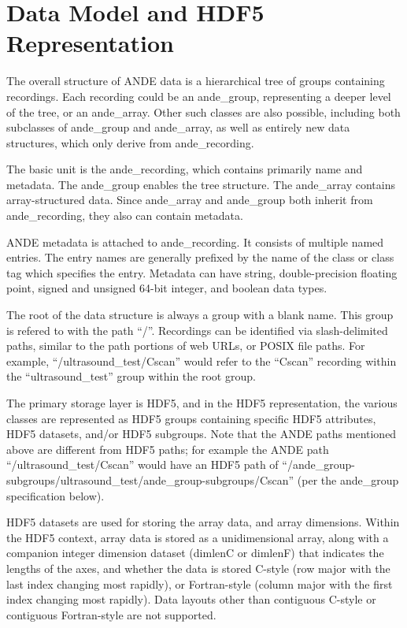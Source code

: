 \documentclass{article}
\begin{document}
\section{Data Model and HDF5 Representation}

The overall structure of ANDE data is a hierarchical tree of groups containing
recordings. Each recording could be an ande\_group, representing a deeper level of the tree, or an ande\_array. Other such classes are also possible, including both subclasses of ande\_group and ande\_array, as well as entirely new data structures, which only derive from ande\_recording.

The basic unit is the ande\_recording, which contains primarily name and metadata. The ande\_group enables the tree structure. The ande\_array contains array-structured data. Since ande\_array and ande\_group both inherit from ande\_recording, they also can contain metadata.

ANDE metadata is attached to ande\_recording. It consists of multiple named entries. The entry names are generally prefixed by the name of the class or class tag which specifies the entry. Metadata can have string, double-precision floating point, signed and unsigned 64-bit integer, and boolean data types.

The root of the data structure is always a group with a blank name. This group is refered to with the path ``/''. Recordings can be identified via slash-delimited paths, similar to the path portions of web URLs, or POSIX file paths. For example, ``/ultrasound\_test/Cscan'' would refer to the ``Cscan'' recording within the ``ultrasound\_test'' group within the root group.

The primary storage layer is HDF5, and in the HDF5 representation, the various classes are represented as HDF5 groups containing specific HDF5 attributes, HDF5 datasets, and/or HDF5 subgroups. Note that the ANDE paths mentioned above are different from HDF5 paths; for example the ANDE path ``/ultrasound\_test/Cscan'' would have an HDF5 path of ``/ande\_group-subgroups/ultrasound\_test/ande\_group-subgroups/Cscan'' (per the ande\_group specification below).

HDF5 datasets are used for storing the array data, and array dimensions. Within the HDF5 context, array data is stored as a unidimensional array, along with a companion integer dimension dataset (dimlenC or dimlenF) that indicates the lengths of the axes, and whether the data is stored C-style (row major with the last index changing most rapidly), or Fortran-style (column major with the first index changing most rapidly). Data layouts other than contiguous C-style or contiguous Fortran-style are not supported.
\end{document}
